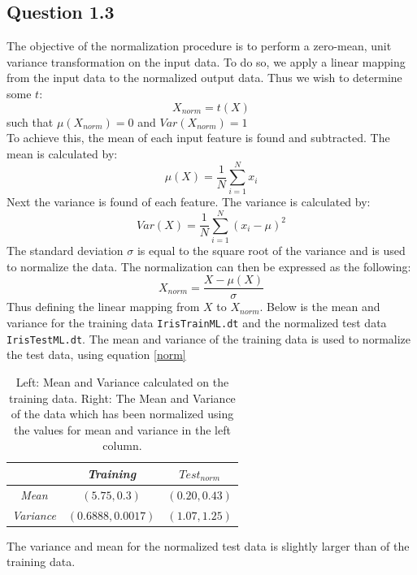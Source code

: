 \documentclass{article}
\begin{document}
\subsection{Question 1.3}
The objective of the normalization procedure is to perform a zero-mean, unit variance transformation on the input data. To do so, we apply a linear mapping from the input data to the normalized output data. Thus we wish to determine some  $t$:
\begin{equation}
X_{norm}=t(X)
\end{equation}
such that $\mu(X_{norm})=0$ and $Var(X_{norm})=1$ \\
To achieve this, the mean of each input feature is found and subtracted. The mean is calculated by:
\begin{equation*}
\mu(X) = \dfrac{1}{N} \sum\limits^{N}_{i=1}x_i
\end{equation*}
 Next the variance is found of each feature. The variance is calculated by:
\begin{equation*}
Var(X) = \dfrac{1}{N} \sum\limits^{N}_{i=1}(x_i - \mu)^2
\end{equation*}
The standard deviation $\sigma$ is equal to the square root of the variance and is used to normalize the data. The normalization can then be expressed as the following:
\begin{equation}
X_{norm} = \dfrac{X - \mu(X) }{\sigma}
\label{norm}
\end{equation}
Thus defining the linear mapping from $X$ to $X_{norm}$. Below is the mean and variance for the training data \texttt{IrisTrainML.dt} and the normalized test data \texttt{IrisTestML.dt}. The mean and variance of the training data is used to normalize the test data, using equation \eqref{norm} \\
\begin{table}[H]
  \centering
  \label{tab:table3}
  \begin{tabular}{c||c|c}
    \textsf{ } & \textsl{Training} & \textsl{$Test_{norm}$} \\
    \hline
    \textsl{Mean} & $(5.75,0.3)$ & $(0.20,0.43)$ \\
    \textsl{Variance} & $(0.6888,0.0017)$ & $(1.07,1.25)$ \\    
  \end{tabular}
  \caption{Left: Mean and Variance calculated on the training data. Right: The Mean and Variance of the data which has been normalized using the values for mean and variance in the left column.} 
\end{table}
The variance and mean for the normalized test data is slightly larger than of the training data.
\end{document}
